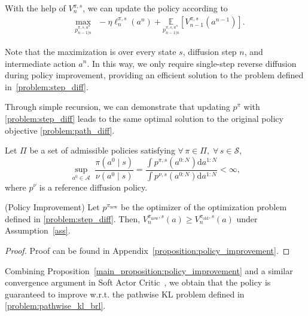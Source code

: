 With the help of $V^{\pi, s}_n$, we can update the policy according to
\begin{equation}\label{problem:step_diff}
    \begin{aligned}
    &\max_{p^{\pi,s,a^n}_{n-1|n}}\ \ -\eta\ell^{\pi,s}_n(a^n) + \underset{p^{\pi,s,a^n}_{n-1|n}}{\mathbb{E}}\left[V^{\pi,s}_{n-1}(a^{n-1})\right].
    \end{aligned}
\end{equation}



Note that the maximization is over every state $s$, diffusion step $n$, and intermediate action $a^n$. In this way, we only require single-step reverse diffusion during policy improvement, providing an efficient solution to the problem defined in~\eqref{problem:step_diff}.

Through simple recursion, we can demonstrate that updating $p^{\pi}$ with \eqref{problem:step_diff} leads to the same optimal solution to the original policy objective \eqref{problem:path_diff}.

\begin{assumption}
\label{ass}
Let $\Pi$ be a set of admissible policies satisfying $\forall\,\pi\in\Pi,\;\forall\,s\in\mathcal{S}$,
\[
\sup_{a^0\in\mathcal{A}}\;\frac{\pi(a^0\mid s)}{\nu(a^0\mid s)}=\frac{\int p^{\pi,s}(a^{0:N})\mathrm{d}a^{1:N}}{\int p^{\nu,s}(a^{0:N})\mathrm{d}a^{1:N}}<\infty,
\]
where $p^\nu$ is a reference diffusion policy.
\end{assumption}
\begin{proposition}{(Policy Improvement)}\label{main_proposition:policy_improvement}
Let $p^{\pi_{\textrm{new}}}$ be the optimizer of the optimization problem defined in \eqref{problem:step_diff}. Then, $V^{\pi_{\textrm{new}},s}_n(a)\geq V^{\pi_{\textrm{old}},s}_n(a)$ under Assumption~\ref{ass}.

\end{proposition}
\begin{proof}
    Proof can be found in Appendix~\ref{proposition:policy_improvement}. 
\end{proof}

Combining Proposition~\ref{main_proposition:policy_improvement} and a similar convergence argument in Soft Actor Critic~\cite{sac}, we obtain that the policy is guaranteed to improve w.r.t. the pathwise KL problem defined in \ref{problem:pathwise_kl_brl}. 

